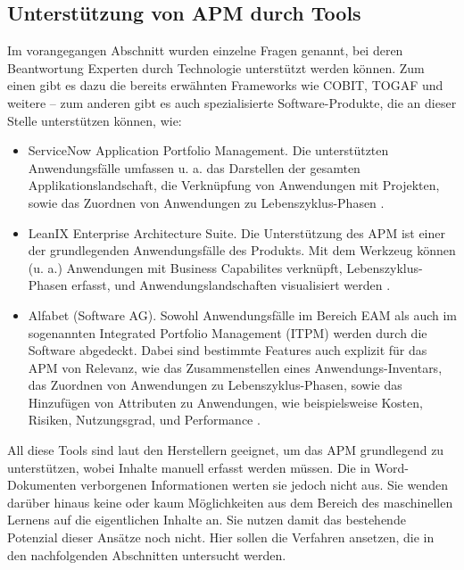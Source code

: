 \subsection{Unterstützung von APM durch Tools}
Im vorangegangen Abschnitt wurden einzelne Fragen genannt, bei deren Beantwortung Experten durch Technologie unterstützt werden können. Zum einen gibt es dazu die bereits erwähnten Frameworks wie COBIT, TOGAF und weitere – zum anderen gibt es auch spezialisierte Software-Produkte, die an dieser Stelle unterstützen können, wie:

\begin{itemize}
\item ServiceNow Application Portfolio Management. Die unterstützten Anwendungsfälle umfassen u. a. das Darstellen der gesamten Applikationslandschaft, die Verknüpfung von Anwendungen mit Projekten, sowie das Zuordnen von Anwendungen zu Lebenszyklus-Phasen \cite{servicenow}.
\item LeanIX Enterprise Architecture Suite. Die Unterstützung des APM ist einer der grundlegenden Anwendungsfälle des Produkts. Mit dem Werkzeug können (u. a.) Anwendungen mit Business Capabilites verknüpft, Lebenszyklus-Phasen erfasst, und Anwendungslandschaften visualisiert werden \cite{leanix}.
\item Alfabet (Software AG). Sowohl Anwendungsfälle im Bereich EAM als auch im sogenannten Integrated Portfolio Management (ITPM) werden durch die Software abgedeckt. Dabei sind bestimmte Features auch explizit für das APM von Relevanz, wie das Zusammenstellen eines Anwendungs-Inventars, das Zuordnen von Anwendungen zu Lebenszyklus-Phasen, sowie das Hinzufügen von Attributen zu Anwendungen, wie beispielsweise Kosten, Risiken, Nutzungsgrad, und Performance \cite{softwareag}.
\end{itemize} 

All diese Tools sind laut den Herstellern geeignet, um das APM grundlegend zu unterstützen, wobei Inhalte manuell erfasst werden müssen. Die in Word-Dokumenten verborgenen Informationen werten sie jedoch nicht aus. Sie wenden darüber hinaus keine oder kaum Möglichkeiten aus dem Bereich des maschinellen Lernens auf die eigentlichen Inhalte an. Sie nutzen damit das bestehende Potenzial dieser Ansätze noch nicht. Hier sollen die Verfahren ansetzen, die in den nachfolgenden Abschnitten untersucht werden.

